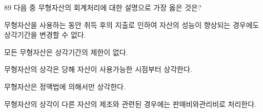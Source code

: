 \begin{question}{89}
다음 중 무형자산의 회계처리에 대한 설명으로 가장 옳은 것은?
\begin{choices}
  \item 무형자산을 사용하는 동안 취득 후의 지출로 인하여 자산의 성능이 향상되는 경우에도 상각기간을 변경할 수 없다.
  \item 모든 무형자산은 상각기간의 제한이 없다.
  \item 무형자산의 상각은 당해 자산이 사용가능한 시점부터 상각한다.
  \item 무형자산은 정액법에 의해서만 상각한다.
  \item 무형자산의 상각이 다른 자산의 제조와 관련된 경우에는 판매비와관리비로 처리한다.
\end{choices}
\end{question}
